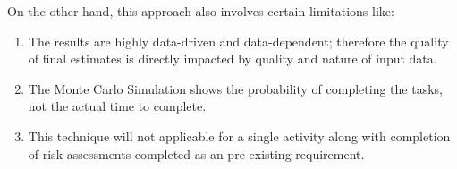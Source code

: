 On the other hand, this approach also involves certain limitations like:
\begin{enumerate}
	\item The results are highly data-driven and data-dependent; therefore the quality of final estimates is directly impacted by quality and nature of input data.
	\item The Monte Carlo Simulation shows the probability of completing the tasks, not the actual time to complete.
	\item  This technique will not applicable for a single activity along with completion of risk assessments completed as an pre-existing requirement.

\end{enumerate} 



















